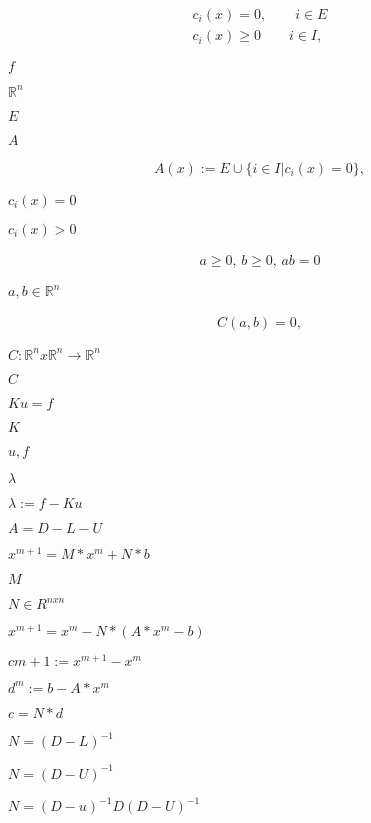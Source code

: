 \documentclass{article}
\begin{document}
\begin{eqnarray*} c_i(x) = 0, \qquad i \in E \\ c_i(x) \ge 0 \qquad i \in I, \end{eqnarray*}
\pagebreak

$ f $
\pagebreak

$ \mathbb{R}^n $
\pagebreak

$ E $
\pagebreak

$ A $
\pagebreak

\begin{eqnarray*} A(x) := E \cup \{ i \in I | c_i(x) = 0 \}, \end{eqnarray*}
\pagebreak

$ c_i(x) = 0 $
\pagebreak

$ c_i(x) > 0 $
\pagebreak

\begin{eqnarray*} a \ge 0, \, b \ge 0, \, a b = 0 \end{eqnarray*}
\pagebreak

$ a, b \in \mathbb{R}^n $
\pagebreak

\begin{eqnarray*} C(a,b) = 0, \end{eqnarray*}
\pagebreak

$ C: \mathbb{R}^n x \mathbb{R}^n \to \mathbb{R}^n $
\pagebreak

$ C $
\pagebreak

$ K u = f $
\pagebreak

$ K $
\pagebreak

$ u, f $
\pagebreak

$ \lambda $
\pagebreak

$ \lambda := f - K u $
\pagebreak

$ A = D - L - U $
\pagebreak

$ x^{m+1} = M * x^m + N * b $
\pagebreak

$ M $
\pagebreak

$ N \in R^{nxn} $
\pagebreak

$ x^{m+1} = x^m - N * (A * x^m - b) $
\pagebreak

$ c{m+1} := x^{m+1} - x^m $
\pagebreak

$ d^m := b - A * x^m $
\pagebreak

$ c = N * d $
\pagebreak

$ N = (D-L)^{-1}$
\pagebreak

$ N = (D-U)^{-1}$
\pagebreak

$ N = (D-u)^{-1}D(D-U)^{-1} $
\pagebreak
\end{document}
